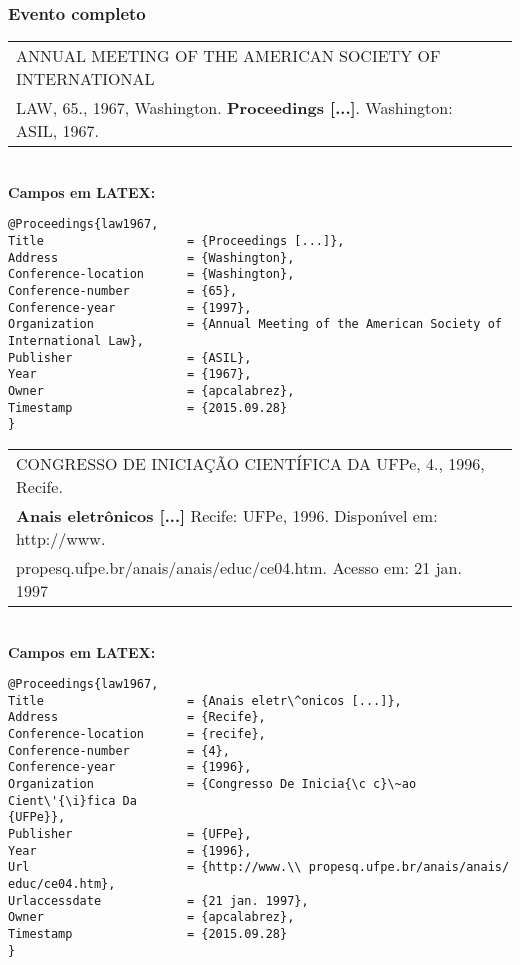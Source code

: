 \subsubsection{Evento completo} 

\begin{tabular}{|l|c|} \hline
	ANNUAL MEETING OF THE AMERICAN SOCIETY OF INTERNATIONAL \\ LAW, 65., 1967,  Washington. \textbf{Proceedings [...]}. Washington: ASIL, 1967. \\\hline
\end{tabular} \\

\textbf{Campos em LATEX:} 

\begin{verbatim}
@Proceedings{law1967,
Title                    = {Proceedings [...]},
Address                  = {Washington},
Conference-location      = {Washington},
Conference-number        = {65},
Conference-year          = {1997},
Organization             = {Annual Meeting of the American Society of 
International Law},
Publisher                = {ASIL},
Year                     = {1967},
Owner                    = {apcalabrez},
Timestamp                = {2015.09.28}
}
\end{verbatim}

\begin{tabular}{|l|c|} \hline
	CONGRESSO DE INICIA\c{C}\~AO CIENT\'IFICA DA UFPe, 4., 1996, Recife. \\ \textbf{Anais eletr\^onicos [...]} Recife: UFPe, 1996. Dispon\'{\i}vel em: http://www.\\ propesq.ufpe.br/anais/anais/educ/ce04.htm. Acesso em: 21 jan. 1997 \\\hline
\end{tabular} \\

\textbf{Campos em LATEX:} 

\begin{verbatim}
@Proceedings{law1967,
Title                    = {Anais eletr\^onicos [...]},
Address                  = {Recife},
Conference-location      = {recife},
Conference-number        = {4},
Conference-year          = {1996},
Organization             = {Congresso De Inicia{\c c}\~ao Cient\'{\i}fica Da 
{UFPe}},
Publisher                = {UFPe},
Year                     = {1996},
Url                      = {http://www.\\ propesq.ufpe.br/anais/anais/
educ/ce04.htm},
Urlaccessdate            = {21 jan. 1997},
Owner                    = {apcalabrez},
Timestamp                = {2015.09.28}
}
\end{verbatim}


